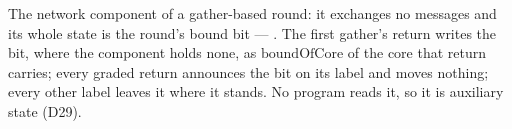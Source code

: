\begin{definition}
  \label{def:aba-gbca-net}
  \leanok
  The network component of a gather-based round: it exchanges no messages and its whole state is the round's bound bit --- .
  The first gather's return writes the bit, where the component holds none, as $\mathrm{boundOfCore}$ of the core that return carries; every graded return announces the bit on its label and moves nothing; every other label leaves it where it stands.
  No program reads it, so it is auxiliary state (D29).
\end{definition}
